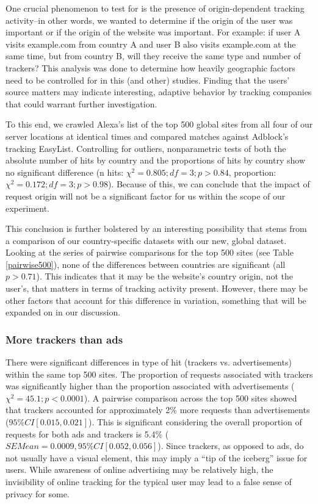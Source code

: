 \documentclass[conference]{IEEEtran}
\begin{document}
One crucial phenomenon to test for is the presence of origin-dependent tracking activity--in other words, we wanted to determine if the origin of the user was important or if the origin of the website was important. For example: if user A visits example.com from country A and user B also visits example.com at the same time, but from country B, will they receive the same type and number of trackers?  This analysis was done to determine how heavily geographic factors need to be controlled for in this (and other) studies. Finding that the users' source matters may indicate interesting, adaptive behavior by tracking companies that could warrant further investigation.

To this end, we crawled Alexa's list of the top 500 global sites from all four of our server locations at identical times and compared matches against Adblock's tracking EasyList. Controlling for outliers, nonparametric tests of both the absolute number of hits by country and the proportions of hits by country show no significant difference (n hits: $\chi^{2}=0.805; df=3; p>0.84$, proportion: $\chi^{2}=0.172; df=3; p>0.98$). Because of this, we can conclude that the impact of request origin will not be a significant factor for us within the scope of our experiment.  

This conclusion is further bolstered by an interesting possibility that stems from a comparison of our country-specific datasets with our new, global dataset. Looking at the series of pairwise comparisons for the top 500 sites (see Table \ref{pairwise500}), none of the differences between countries are significant (all $p>0.71$). This indicates that it may be the website's country origin, not the user's, that matters in terms of tracking activity present. However, there may be other factors that account for this difference in variation, something that will be expanded on in our discussion. 

\subsubsection{More trackers than ads}
There were significant differences in type of hit (trackers vs. advertisements) within the same top 500 sites. The proportion of requests associated with trackers was significantly higher than the proportion associated with advertisements ($\chi^{2}=45.1; p<0.0001$). A pairwise comparison across the top 500 sites showed that trackers accounted for approximately 2\% more requests than advertisements ($95\% CI [0.015, 0.021]$). This is significant considering the overall proportion of requests for both ads and trackers is 5.4\% ($SEMean = 0.0009, 95\% CI [0.052, 0.056]$). Since trackers, as opposed to ads, do not usually have a visual element, this may imply a ``tip of the iceberg'' issue for users. While awareness of online advertising may be relatively high, the invisibility of online tracking for the typical user may lead to a false sense of privacy for some. 
\end{document}
